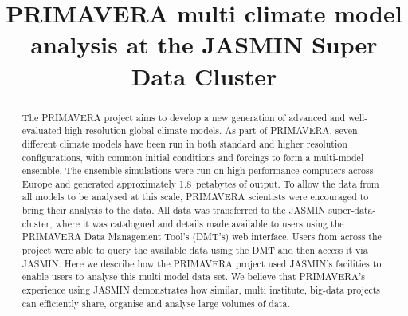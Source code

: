 \documentclass[gmd, manuscript]{copernicus}
\begin{document}
\title{PRIMAVERA multi climate model analysis at the JASMIN Super Data Cluster}













\received{}
\pubdiscuss{} %
\revised{}
\accepted{}
\published{}




\maketitle



\begin{abstract}
The PRIMAVERA project aims to develop a new generation of advanced and well-evaluated high-resolution global climate models. As part of PRIMAVERA, seven different climate models have been run in both standard and higher resolution configurations, with common initial conditions and forcings to form a multi-model ensemble. The ensemble simulations were run on high performance computers across Europe and generated approximately 1.8~petabytes of output. To allow the data from all models to be analysed at this scale, PRIMAVERA scientists were encouraged to bring their analysis to the data. All data was transferred to the JASMIN super-data-cluster, where it was catalogued and details made available to users using the PRIMAVERA Data Management Tool's (DMT's) web interface. Users from across the project were able to query the available data using the DMT and then access it via JASMIN. Here we describe how the PRIMAVERA project used JASMIN's facilities to enable users to analyse this multi-model data set. We believe that PRIMAVERA's experience using JASMIN demonstrates how similar, multi institute, big-data projects can efficiently share, organise and analyse large volumes of data.
\end{abstract}
\end{document}
